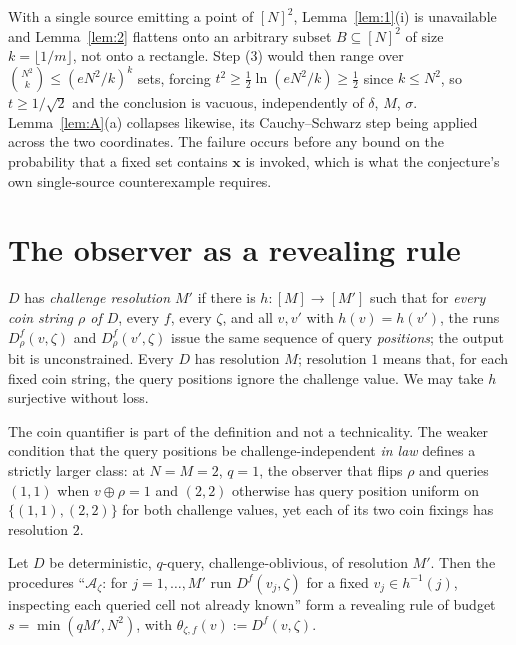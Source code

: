 \documentclass{aicr-solution}
\newcommand{\vx}{\mathbf{x}}
\begin{document}
\begin{remark}\label{rem:onesource}
With a single source emitting a point of $[N]^{2}$, Lemma~\ref{lem:1}(i) is
unavailable and Lemma~\ref{lem:2} flattens onto an arbitrary subset
$B \subseteq [N]^{2}$ of size $k = \lfloor 1/m \rfloor$, not onto a rectangle. Step
(3) would then range over $\binom{N^{2}}{k} \le (eN^{2}/k)^{k}$ sets, forcing
$t^{2} \ge \frac12 \ln(eN^{2}/k) \ge \frac12$ since $k \le N^{2}$, so
$t \ge 1/\sqrt2$ and the conclusion is vacuous, independently of $\delta$, $M$,
$\sigma$. Lemma~\ref{lem:A}(a) collapses likewise, its Cauchy--Schwarz step being
applied across the two coordinates. The failure occurs before any bound on the
probability that a fixed set contains $\vx$ is invoked, which is what the
conjecture's own single-source counterexample requires.
\end{remark}

\section{The observer as a revealing rule}\label{sec:revealing}

\begin{definition}\label{def:res}
$D$ has \emph{challenge resolution $M'$} if there is $h : [M] \to [M']$ such that
for \emph{every coin string $\rho$ of $D$}, every $f$, every $\zeta$, and all
$v,v'$ with $h(v) = h(v')$, the runs $D^{f}_\rho(v,\zeta)$ and
$D^{f}_\rho(v',\zeta)$ issue the same sequence of query \emph{positions}; the output
bit is unconstrained. Every $D$ has resolution $M$; resolution $1$ means that, for
each fixed coin string, the query positions ignore the challenge value. We may take
$h$ surjective without loss.
\end{definition}

The coin quantifier is part of the definition and not a technicality. The weaker
condition that the query positions be challenge-independent \emph{in law} defines a
strictly larger class: at $N = M = 2$, $q = 1$, the observer that flips $\rho$ and
queries $(1,1)$ when $v \oplus \rho = 1$ and $(2,2)$ otherwise has query position
uniform on $\{(1,1),(2,2)\}$ for both challenge values, yet each of its two coin
fixings has resolution $2$.

\begin{lemma}\label{lem:4}
Let $D$ be deterministic, $q$-query, challenge-oblivious, of resolution $M'$. Then
the procedures ``$\mathcal{A}_\zeta$: for $j = 1,\dots,M'$ run $D^{f}(v_j,\zeta)$
for a fixed $v_j \in h^{-1}(j)$, inspecting each queried cell not already known''
form a revealing rule of budget $s = \min(qM',N^{2})$, with
$\theta_{\zeta,f}(v) := D^{f}(v,\zeta)$.
\end{lemma}
\end{document}
